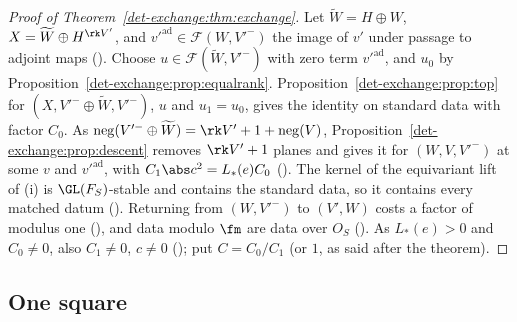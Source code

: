 \begin{proof}[Proof of Theorem~\ref{det-exchange:thm:exchange}]
Let $\widetilde W=H\oplus W$, $X=\widetilde W\oplus H^{\rk V'}$, and $v'^{\mathrm{ad}}\in\mathcal F(W,V'^-)$ the image
of $v'$ under passage to adjoint maps (). Choose
$u\in\mathcal F(\widetilde W,V'^-)$ with zero term $v'^{\mathrm{ad}}$, and $u_0$ by
Proposition~\ref{det-exchange:prop:equalrank}. Proposition~\ref{det-exchange:prop:top} for
$(X,V'^-\oplus \widetilde W,V'^-)$, $u$ and $u_1=u_0$, gives the identity on standard data with factor
$C_0$. As $\operatorname{neg}(V'^-\oplus \widetilde W)=\rk V'+1+\operatorname{neg}(V)$,
Proposition~\ref{det-exchange:prop:descent} removes $\rk V'+1$ planes and gives it for
$(W,V,V'^-)$ at some $v$ and $v'^{\mathrm{ad}}$, with $C_1\abs c^2=L_*(e)C_0$
(). The kernel of the equivariant
lift of (i) is $\GL(F_S)$-stable and contains the standard data, so it contains every matched datum
(). Returning from $(W,V'^-)$ to $(V',W)$ costs
a factor of modulus one (), and data modulo $\fm$ are data
over $O_S$ (). As $L_*(e)>0$ and $C_0\ne0$, also
$C_1\ne0$, $c\ne0$ (); put $C=C_0/C_1$ (or $1$, as said after
the theorem).
\end{proof}

\subsection{One square}

